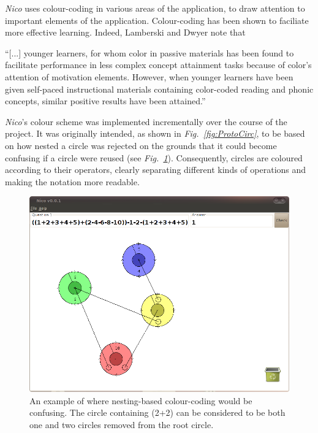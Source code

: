 \documentclass[12pt,twoside,notitlepage,xetex]{report}
\begin{document}
\emph{Nico} uses colour-coding in various areas of the application, to draw attention to important elements of the application.  Colour-coding has been shown to faciliate more effective learning.  Indeed, Lamberski and Dwyer note that
\begin{center}
\parbox[c]{\textwidth-2cm}{
\small
``[...] younger learners, for whom color in passive materials has been found to facilitate performance in less complex concept attainment tasks because of color's attention of motivation elements.  However, when younger learners have been given self-paced instructional materials containing color-coded reading and phonic concepts, similar positive results have been attained.'' \cite{Lamberski1983}
}
\end{center}
\emph{Nico}'s colour scheme was implemented incrementally over the course of the project.  It was originally intended, as shown in \emph{Fig.~\ref{fig:ProtoCirc}}, to be based on how nested a circle was rejected on the grounds that it could become confusing if a circle were reused (see \emph{Fig.~\ref{fig:Nico2}}).  Consequently, circles are coloured according to their operators, clearly separating different kinds of operations and making the notation more readable.

\begin{center}
\begin{figure}[H]
\begin{center}
\includegraphics[width=\textwidth-2cm]{figs/nico_screen_02.png}
\end{center}
\caption{An example of where nesting-based colour-coding would be confusing.  The circle containing (2+2) can be considered to be both one and two circles removed from the root circle.}
\label{fig:Nico2}
\end{figure}
\end{center}
\end{document}
